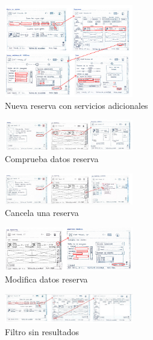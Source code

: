 \begin{figure}[H]
    \centering
    \includegraphics[width=0.5\textwidth]{Imagenes/Keypath/Marta2.png}
    \caption{Nueva reserva con servicios adicionales}
    \label{fig:Marta2}
\end{figure}

\begin{figure}[H]
    \centering
    \includegraphics[width=0.5\textwidth]{Imagenes/Keypath/Marta3.png}
    \caption{Comprueba datos reserva}
    \label{fig:Marta3}
\end{figure}

\begin{figure}[H]
    \centering
    \includegraphics[width=0.5\textwidth]{Imagenes/Keypath/Marta4.png}
    \caption{Cancela una reserva}
    \label{fig:Marta4}
\end{figure}

\begin{figure}[H]
    \centering
    \includegraphics[width=0.5\textwidth]{Imagenes/Keypath/Marta5.png}
    \caption{Modifica datos reserva}
    \label{fig:Marta5}
\end{figure}

\begin{figure}[H]
    \centering
    \includegraphics[width=0.5\textwidth]{Imagenes/Keypath/Marta6.png}
    \caption{Filtro sin resultados}
    \label{fig:Marta6}
\end{figure}

